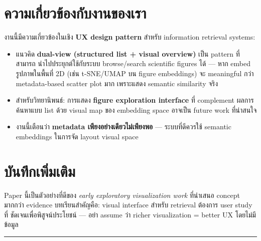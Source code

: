 \documentclass[10pt,a4paper]{article}
\begin{document}
\section*{ความเกี่ยวข้องกับงานของเรา}

งานนี้มีความเกี่ยวข้องในเชิง \textbf{UX design pattern} สำหรับ information retrieval systems:
\begin{itemize}
  \item แนวคิด \textbf{dual-view (structured list + visual overview)} เป็น pattern ที่สามารถ
    นำไปประยุกต์ใช้กับระบบ browse/search scientific figures ได้ --- หาก embed รูปภาพในพื้นที่
    2D (เช่น t-SNE/UMAP บน figure embeddings) จะ meaningful กว่า metadata-based scatter plot
    มาก เพราะแสดง semantic similarity จริง
  \item สำหรับวิทยานิพนธ์: การแสดง \textbf{figure exploration interface} ที่ complement ผลการ
    ค้นหาแบบ list ด้วย visual map ของ embedding space อาจเป็น future work ที่น่าสนใจ
  \item งานนี้เตือนว่า \textbf{metadata เพียงอย่างเดียวไม่เพียงพอ} --- ระบบที่ดีควรใช้ semantic
    embeddings ในการจัด layout visual space
\end{itemize}

\section*{บันทึกเพิ่มเติม}
Paper นี้เป็นตัวอย่างที่ดีของ \textit{early exploratory visualization work} ที่นำเสนอ concept
มากกว่า evidence บทเรียนสำคัญคือ: visual interface สำหรับ retrieval ต้องการ user study ที่
ชัดเจนเพื่อพิสูจน์ประโยชน์ --- อย่า assume ว่า richer visualization = better UX โดยไม่มีข้อมูล

\vspace{16pt}
\noindent\rule{\textwidth}{1pt}
\end{document}
